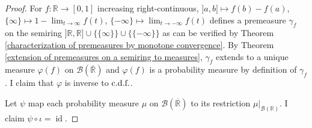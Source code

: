 \documentclass[11pt, a4paper, openany]{book}
\theoremstyle{definition}
\DeclareMathOperator{\id}{id}
\newcommand{\er}{\overline{\mathbb{R}}}
\begin{document}
    \begin{proof}
        For $f:\mathbb{R}\rightarrow [0,1]$ increasing right-continuous, $]a,b]\mapsto f(b)-f(a)$, $\{\infty\}\mapsto 1-\lim_{t\to\infty}f(t)$, $\{-\infty\}\mapsto \lim_{t\to-\infty}f(t)$ defines a premeasure $\gamma_f$ on the semiring $]\mathbb{R},\mathbb{R}]\cup\{\{\infty\}\}\cup\{\{-\infty\}\}$ as can be verified by Theorem \ref{characterization of premeasures by monotone convergence}. By Theorem \ref{extension of premeasures on a semiring to measures}, $\gamma_f$ extends to a unique measure $\varphi(f)$ on $\mathscr{B}(\er)$ and $\varphi(f)$ is a probability measure by definition of $\gamma_f$. I claim that $\varphi$ is inverse to $\textup{c.d.f.}$. %

        Let $\psi$ map each probability measure $\mu$ on $\mathscr{B}(\er)$ to its restriction $\mu|_{\mathscr{B}(\mathbb{R})}$. I claim $\psi\circ\iota=\id$.
    \end{proof}
\end{document}
